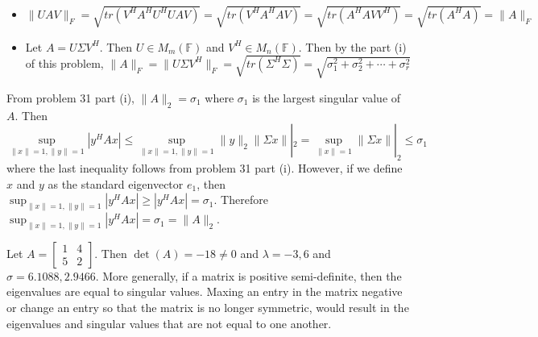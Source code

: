 \documentclass[12pt]{article}
\newcommand{\F}{\mathbb{F}}
\newenvironment{problem}[2][Problem]{\begin{trivlist}
\item[\hskip \labelsep {\bfseries #1}\hskip \labelsep {\bfseries #2}]}{\end{trivlist}}
\begin{document}
\begin{problem}{32.}\hfill
\begin{itemize}
\item [(i)] $\| UAV\|_F = \sqrt{tr(V^HA^HU^HUAV)} = \sqrt{tr(V^HA^HAV)} =  \sqrt{tr(A^HAVV^H)}  = \sqrt{tr(A^HA)} = \|A\|_F $ 
\item [(ii)] Let $A = U\Sigma V^H$. Then $U \in M_m(\F)$ and $V^H \in M_n(\F)$. Then by the part (i) of this problem, $\|A\|_F = \| U\Sigma V^H\|_F = \sqrt{tr(\Sigma^H\Sigma)}  = \sqrt{\sigma_1^2 + \sigma_2^2 + \cdots + \sigma_r^2}$
\end{itemize}
\end{problem}

\begin{problem}{33.} 
From problem 31 part (i), $\|A\|_2 = \sigma_1$ where $\sigma_1$ is the largest singular value of $A$. Then 
$$\sup_{\|x\| = 1, \|y\| = 1} |y^HAx| \leq \sup_{\|x\| = 1, \|y\| = 1} \|y\|_2 \| \Sigma x\||_2  = \sup_{\|x\| = 1}\| \Sigma x\||_2 \leq \sigma_1$$
where the last inequality follows from problem 31 part (i). 
However, if we define $x$ and $y$ as the standard eigenvector $e_1$, then $\sup_{\|x\| = 1, \|y\| = 1} |y^HAx| \geq |y^HAx| = \sigma_1$. Therefore  $\sup_{\|x\| = 1, \|y\| = 1} |y^HAx| = \sigma_1 = \|A\|_2$. 
\end{problem}

\begin{problem}{36.} 
Let $A = \begin{bmatrix}
         1 & 4 \\
         5 & 2
        \end{bmatrix}$. Then $\det(A) = -18 \neq 0$ and $\lambda = -3, 6$ and $\sigma =  6.1088,  2.9466$. More generally, if a matrix is positive semi-definite, then the eigenvalues are equal to singular values. Maxing an entry in the matrix negative or change an entry so that the matrix is no longer symmetric, would result in the eigenvalues and singular values that are not equal to one another. 
        
\end{problem}
\end{document}
